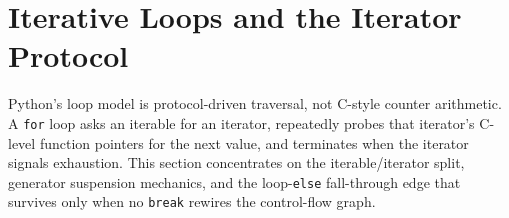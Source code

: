 \section{Iterative Loops and the Iterator Protocol}

Python's loop model is protocol-driven traversal, not C-style counter arithmetic. A \texttt{for} loop asks an iterable for an iterator, repeatedly probes that iterator's C-level function pointers for the next value, and terminates when the iterator signals exhaustion. This section concentrates on the iterable/iterator split, generator suspension mechanics, and the loop-\texttt{else} fall-through edge that survives only when no \texttt{break} rewires the control-flow graph.
